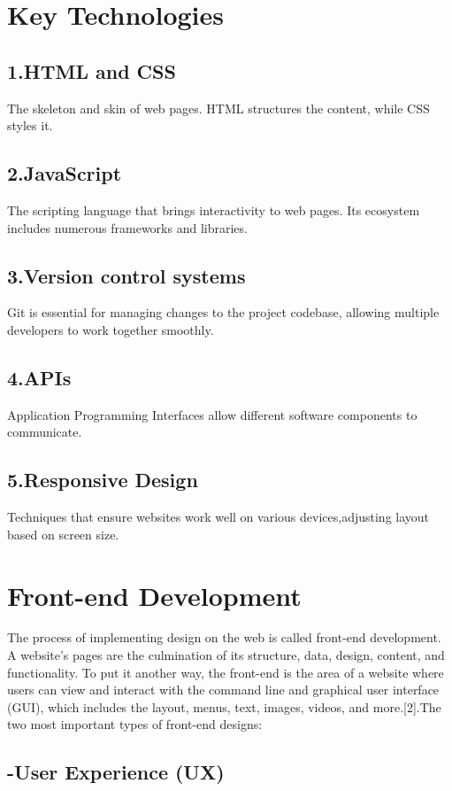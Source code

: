 \section{Key Technologies}
\subsection*{1.HTML and CSS}The skeleton and skin of web pages. HTML structures the content,
while CSS styles it.
\subsection*{2.JavaScript} The scripting language that brings interactivity to web pages. Its ecosystem includes numerous frameworks and libraries.
\subsection*{3.Version control systems}Git is essential for managing changes to the project codebase, allowing multiple developers to work together smoothly.
\subsection*{4.APIs}Application Programming Interfaces allow different software components to communicate.
\subsection*{5.Responsive Design}Techniques that ensure websites work well on various devices,adjusting layout based on screen size.
\section{Front-end Development}The process of implementing design on the web is called front-end development. A website's pages are the culmination of its structure, data, design, content, and functionality. To put it another way, the front-end is the area of a website where users can view and interact with the command line and graphical user interface (GUI), which includes the layout, menus, text, images, videos, and more.[2].\newline The two most important types of front-end designs:
\subsection*{-User Experience (UX)}
